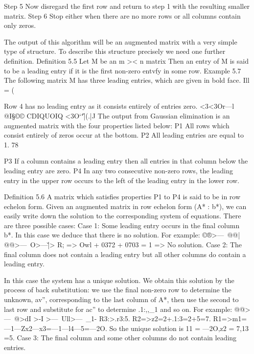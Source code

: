 \begin{itemize}
	
	
	Step 5 Now disregard the ﬁrst row and return to step 1 with the
	resulting smaller matrix.
	Step 6 Stop either when there are no more rows or all columns
	contain only zeros.
	
	
	
	The output of this algorithm will be an augmented matrix with a
	very simple type of structure. To describe this structure precisely we
	need one further deﬁnition.
	Definition 5.5 Let M be an m >< n matrix Then an entry of M is said to
	be a leading entry if it is the first non-zero entvfy in some row.
	Example 5.7 The following matrix M has three leading entries, which
	are given in bold face.
	Ill = (
	
	
	
	Row 4 has no leading entry as it consists entirely of entries zero.
	<3<3Or—l
	@I§©©
	CDIQUOIQ
	<3O‘\U‘|(.|J
	The output from Gaussian elimination is an augmented matrix with
	the four properties listed below:
	P1 All rows which consist entirely of zeros occur at the bottom.
	P2 All leading entries are equal to 1.
	78
	
	
	
	P3 If a column contains a leading entry then all entries in that
	column below the leading entry are zero.
	P4 In any two consecutive non-zero rows, the leading entry in the
	upper row occurs to the left of the leading entry in the lower
	row.
	
	
	
	Definition 5.6 A matrix which satisﬁes properties P1 to P4 is said to be
	in row echelon form.
	Given an augmented matrix in row echelon form (A* : b*), we can
	easily write down the solution to the corresponding system of
	equations. There are three possible cases:
	Case 1: Some leading entry occurs in the final column b*.
	In this case we deduce that there is no solution. For example:
	©®>—\
	@@|\)
	@@>—\
	O>—\v|>
	R; => Owl + 0372 + 0703 = 1 => No solution.
	Case 2: The ﬁnal column does not contain a leading entry but all
	other columns do contain a leading entry.
	
	
	
	In this case the system has a unique solution. We obtain this
	solution by the process of back substitution: we use the ﬁnal
	non-zero row to determine the unknown, av”, corresponding to
	the last column of A*, then use the second to last row and
	substitute for ac” to determine .1:,,_1 and so on. For example:
	@@>—\
	@>dI\J
	>-I >—\
	Ull\7>—\
	_1-
	R3:>.r3:5.
	R2=>z2=2+.1:3=2+5=7.
	R1=>m1=—1—Zx2—x3=—1—l4—5=—2O.
	So the unique solution is 11 = —2O,z2 = 7,13 =5.
	Case 3: The final column and some other columns do not contain
	leading entries.
	

\end{itemize}
